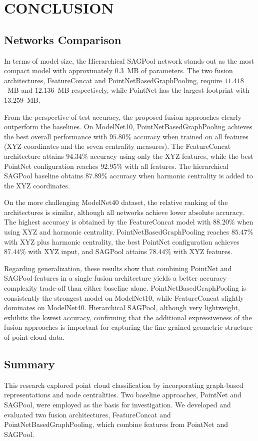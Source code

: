 \documentclass[conference]{IEEEtran}
\begin{document}
\section{CONCLUSION}

\subsection{Networks Comparison}
In terms of model size, the Hierarchical SAGPool network stands out as the
most compact model with approximately $0.3$~MB of parameters. The two fusion
architectures, FeatureConcat and PointNetBasedGraphPooling, require
$11.418$~MB and $12.136$~MB respectively, while PointNet has the largest
footprint with $13.259$~MB.

From the perspective of test accuracy, the proposed fusion approaches clearly
outperform the baselines. On ModelNet10, PointNetBasedGraphPooling achieves
the best overall performance with $95.80\%$ accuracy when trained on all
features (XYZ coordinates and the seven centrality measures). The
FeatureConcat architecture attains $94.34\%$ accuracy using only the XYZ
features, while the best PointNet configuration reaches $92.95\%$ with all
features. The hierarchical SAGPool baseline obtains $87.89\%$ accuracy when
harmonic centrality is added to the XYZ coordinates.

On the more challenging ModelNet40 dataset, the relative ranking of the
architectures is similar, although all networks achieve lower absolute
accuracy. The highest accuracy is obtained by the FeatureConcat model with
$88.20\%$ when using XYZ and harmonic centrality. PointNetBasedGraphPooling
reaches $85.47\%$ with XYZ plus harmonic centrality, the best PointNet
configuration achieves $87.44\%$ with XYZ input, and SAGPool attains
$78.44\%$ with XYZ features.

Regarding generalization, these results show that combining PointNet and
SAGPool features in a single fusion architecture yields a better
accuracy--complexity trade-off than either baseline alone. PointNetBasedGraphPooling
is consistently the strongest model on ModelNet10, while FeatureConcat
slightly dominates on ModelNet40. Hierarchical SAGPool, although very
lightweight, exhibits the lowest accuracy, confirming that the additional
expressiveness of the fusion approaches is important for capturing the
fine-grained geometric structure of point cloud data.


\subsection{Summary}
This research explored point cloud classification by incorporating graph-based representations and node centralities. Two baseline approaches, PointNet and SAGPool, were employed as the basis for investigation. We developed and evaluated two fusion architectures, FeatureConcat and PointNetBasedGraphPooling, which combine features from PointNet and SAGPool.
\end{document}
